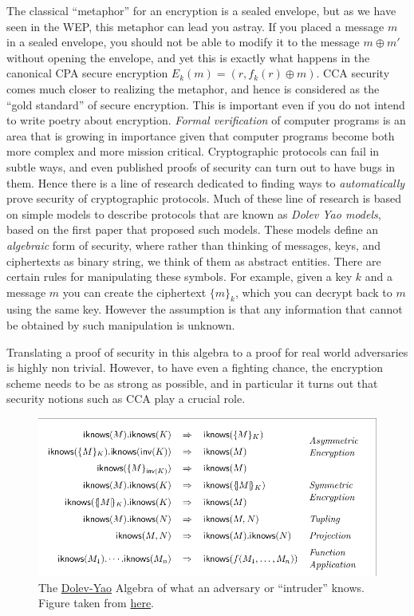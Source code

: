 The classical ``metaphor'' for an encryption is a sealed envelope, but
as we have seen in the WEP, this metaphor can lead you astray. If you
placed a message \(m\) in a sealed envelope, you should not be able to
modify it to the message \(m \oplus m'\) without opening the envelope,
and yet this is exactly what happens in the canonical CPA secure
encryption \(E_k(m)=(r,f_k(r) \oplus m)\). CCA security comes much
closer to realizing the metaphor, and hence is considered as the ``gold
standard'' of secure encryption. This is important even if you do not
intend to write poetry about encryption. \emph{Formal verification} of
computer programs is an area that is growing in importance given that
computer programs become both more complex and more mission critical.
Cryptographic protocols can fail in subtle ways, and even published
proofs of security can turn out to have bugs in them. Hence there is a
line of research dedicated to finding ways to \emph{automatically} prove
security of cryptographic protocols. Much of these line of research is
based on simple models to describe protocols that are known as
\emph{Dolev Yao models}, based on the first paper that proposed such
models. These models define an \emph{algebraic} form of security, where
rather than thinking of messages, keys, and ciphertexts as binary
string, we think of them as abstract entities. There are certain rules
for manipulating these symbols. For example, given a key \(k\) and a
message \(m\) you can create the ciphertext \(\{ m \}_k\), which you can
decrypt back to \(m\) using the same key. However the assumption is that
any information that cannot be obtained by such manipulation is unknown.

Translating a proof of security in this algebra to a proof for real
world adversaries is highly non trivial. However, to have even a
fighting chance, the encryption scheme needs to be as strong as
possible, and in particular it turns out that security notions such as
CCA play a crucial role.

\begin{figure}
\centering
\includegraphics[width=\textwidth, height=0.25\paperheight, keepaspectratio]{../figure/Dolev-Yao-intruder-rules.png}
\caption{The
\href{https://en.wikipedia.org/wiki/Dolev\%E2\%80\%93Yao_model}{Dolev-Yao}
Algebra of what an adversary or ``intruder'' knows. Figure taken from
\href{https://www.ceeol.com/search/article-detail?id=896120}{here}.}
\label{dolevyaofig}
\end{figure}

